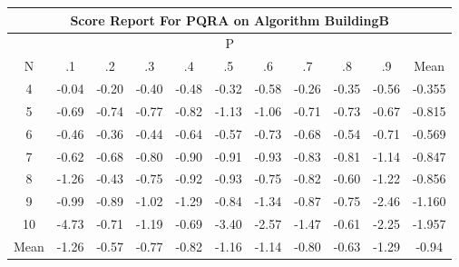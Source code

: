 \documentclass[11pt,a4paper]{report}
\begin{document}
\begin{longtable}{ | c || c | c | c | c | c | c | c | c | c || c |}
\hline
\multicolumn{11}{|c|}{ Score Report For PQRA on Algorithm BuildingB} \\
\hline
\multicolumn{11}{|c|}{ P } \\
\hline
N & .1 & .2 & .3 & .4 & .5 & .6 & .7 & .8 & .9 & Mean\\
 \hline
 \hline
 \endhead
  4 &  \cellcolor[HTML]{FFFFFF} -0.04 &  \cellcolor[HTML]{FFF7F7} -0.20 &  \cellcolor[HTML]{FFF7F7} -0.40 &  \cellcolor[HTML]{FFEFEF} -0.48 &  \cellcolor[HTML]{FFF7F7} -0.32 &  \cellcolor[HTML]{FFEFEF} -0.58 &  \cellcolor[HTML]{FFF7F7} -0.26 &  \cellcolor[HTML]{FFF7F7} -0.35 &  \cellcolor[HTML]{FFEFEF} -0.56 & -0.355 \\
  5 &  \cellcolor[HTML]{FFEFEF} -0.69 &  \cellcolor[HTML]{FFEFEF} -0.74 &  \cellcolor[HTML]{FFEFEF} -0.77 &  \cellcolor[HTML]{FFE7E7} -0.82 &  \cellcolor[HTML]{FFDFDF} -1.13 &  \cellcolor[HTML]{FFE7E7} -1.06 &  \cellcolor[HTML]{FFEFEF} -0.71 &  \cellcolor[HTML]{FFEFEF} -0.73 &  \cellcolor[HTML]{FFEFEF} -0.67 & -0.815 \\
  6 &  \cellcolor[HTML]{FFF7F7} -0.46 &  \cellcolor[HTML]{FFF7F7} -0.36 &  \cellcolor[HTML]{FFF7F7} -0.44 &  \cellcolor[HTML]{FFEFEF} -0.64 &  \cellcolor[HTML]{FFEFEF} -0.57 &  \cellcolor[HTML]{FFEFEF} -0.73 &  \cellcolor[HTML]{FFEFEF} -0.68 &  \cellcolor[HTML]{FFEFEF} -0.54 &  \cellcolor[HTML]{FFEFEF} -0.71 & -0.569 \\
  7 &  \cellcolor[HTML]{FFEFEF} -0.62 &  \cellcolor[HTML]{FFEFEF} -0.68 &  \cellcolor[HTML]{FFE7E7} -0.80 &  \cellcolor[HTML]{FFE7E7} -0.90 &  \cellcolor[HTML]{FFE7E7} -0.91 &  \cellcolor[HTML]{FFE7E7} -0.93 &  \cellcolor[HTML]{FFE7E7} -0.83 &  \cellcolor[HTML]{FFE7E7} -0.81 &  \cellcolor[HTML]{FFDFDF} -1.14 & -0.847 \\
  8 &  \cellcolor[HTML]{FFDFDF} -1.26 &  \cellcolor[HTML]{FFF7F7} -0.43 &  \cellcolor[HTML]{FFEFEF} -0.75 &  \cellcolor[HTML]{FFE7E7} -0.92 &  \cellcolor[HTML]{FFE7E7} -0.93 &  \cellcolor[HTML]{FFEFEF} -0.75 &  \cellcolor[HTML]{FFE7E7} -0.82 &  \cellcolor[HTML]{FFEFEF} -0.60 &  \cellcolor[HTML]{FFDFDF} -1.22 & -0.856 \\
  9 &  \cellcolor[HTML]{FFE7E7} -0.99 &  \cellcolor[HTML]{FFE7E7} -0.89 &  \cellcolor[HTML]{FFE7E7} -1.02 &  \cellcolor[HTML]{FFDFDF} -1.29 &  \cellcolor[HTML]{FFE7E7} -0.84 &  \cellcolor[HTML]{FFDFDF} -1.34 &  \cellcolor[HTML]{FFE7E7} -0.87 &  \cellcolor[HTML]{FFEFEF} -0.75 &  \cellcolor[HTML]{FFBFBF} -2.46 & -1.160 \\
  10 &  \cellcolor[HTML]{FF8787} -4.73 &  \cellcolor[HTML]{FFEFEF} -0.71 &  \cellcolor[HTML]{FFDFDF} -1.19 &  \cellcolor[HTML]{FFEFEF} -0.69 &  \cellcolor[HTML]{FFA7A7} -3.40 &  \cellcolor[HTML]{FFBFBF} -2.57 &  \cellcolor[HTML]{FFD7D7} -1.47 &  \cellcolor[HTML]{FFEFEF} -0.61 &  \cellcolor[HTML]{FFC7C7} -2.25 & -1.957 \\
 \hline
 \hline
Mean &  \cellcolor[HTML]{FFDFDF} -1.26 &  \cellcolor[HTML]{FFEFEF} -0.57 &  \cellcolor[HTML]{FFEFEF} -0.77 &  \cellcolor[HTML]{FFE7E7} -0.82 &  \cellcolor[HTML]{FFDFDF} -1.16 &  \cellcolor[HTML]{FFDFDF} -1.14 &  \cellcolor[HTML]{FFE7E7} -0.80 &  \cellcolor[HTML]{FFEFEF} -0.63 &  \cellcolor[HTML]{FFDFDF} -1.29 &  \cellcolor[HTML]{FFE7E7} -0.94
\end{longtable}
\end{document}
